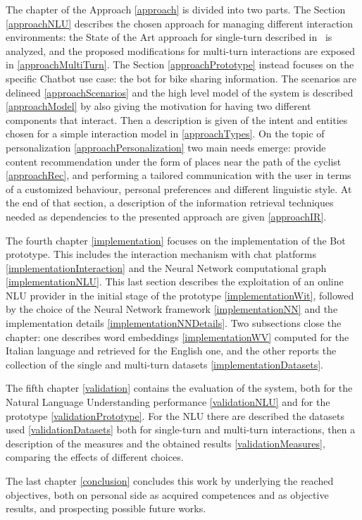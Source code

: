 The chapter of the Approach \ref{approach} is divided into two parts. The Section \ref{approachNLU} describes the chosen approach for managing different interaction environments: the State of the Art approach for single-turn described in~\cite{liu2016attention} is analyzed, and the proposed modifications for multi-turn interactions are exposed in \ref{approachMultiTurn}. The Section \ref{approachPrototype} instead focuses on the specific Chatbot use case: the bot for bike sharing information. The scenarios are delineed \ref{approachScenarios} and the high level model of the system is described \ref{approachModel} by also giving the motivation for having two different components that interact. Then a description is given of the intent and entities chosen for a simple interaction model in \ref{approachTypes}. On the topic of personalization \ref{approachPersonalization} two main needs emerge: provide content recommendation under the form of places near the path of the cyclist \ref{approachRec}, and performing a tailored communication with the user in terms of a customized behaviour, personal preferences and different linguistic style. At the end of that section, a description of the information retrieval techniques needed as dependencies to the presented approach are given \ref{approachIR}.

The fourth chapter \ref{implementation} focuses on the implementation of the Bot prototype. This includes the interaction mechanism with chat platforms \ref{implementationInteraction} and the Neural Network computational graph \ref{implementationNLU}. This last section describes the exploitation of an online NLU provider in the initial stage of the prototype \ref{implementationWit}, followed by the choice of the Neural Network framework \ref{implementationNN} and the implementation details \ref{implementationNNDetails}. Two subsections close the chapter: one describes word embeddings \ref{implementationWV} computed for the Italian language and retrieved for the English one, and the other reports the collection of the single and multi-turn datasets \ref{implementationDatasets}.

The fifth chapter \ref{validation} contains the evaluation of the system, both for the Natural Language Understanding performance \ref{validationNLU} and for the prototype \ref{validationPrototype}. For the NLU there are described the datasets used \ref{validationDatasets} both for single-turn and multi-turn interactions, then a description of the measures and the obtained results \ref{validationMeasures}, comparing the effects of different choices.

The last chapter \ref{conclusion} concludes this work by underlying the reached objectives, both on personal side as acquired competences and as objective results, and prospecting possible future works.
